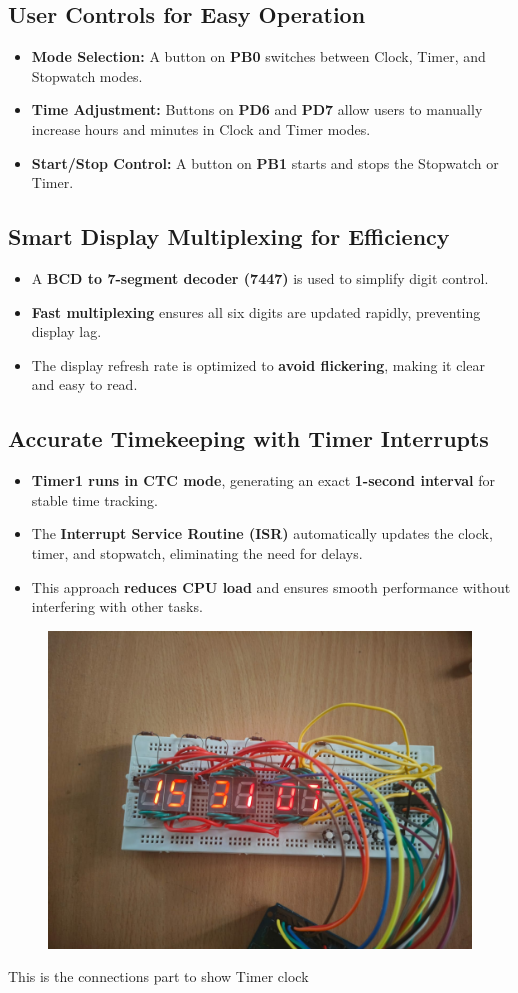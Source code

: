 \documentclass[journal]{IEEEtran}
\begin{document}
\subsection{User Controls for Easy Operation}  
\vspace{0.3cm}  
\begin{itemize}  
    \item \textbf{Mode Selection:} A button on \textbf{PB0} switches between Clock, Timer, and Stopwatch modes.  
    \item \textbf{Time Adjustment:} Buttons on \textbf{PD6} and \textbf{PD7} allow users to manually increase hours and minutes in Clock and Timer modes. 
    \item \textbf{Start/Stop Control:} A button on \textbf{PB1} starts and stops the Stopwatch or Timer.  
\end{itemize}  
\vspace{0.5cm}  

\subsection{Smart Display Multiplexing for Efficiency}  
\vspace{0.3cm}  
\begin{itemize}  
    \item A \textbf{BCD to 7-segment decoder (7447)} is used to simplify digit control.  
    \item \textbf{Fast multiplexing} ensures all six digits are updated rapidly, preventing display lag.  
    \item The display refresh rate is optimized to \textbf{avoid flickering}, making it clear and easy to read.  
\end{itemize}  
\vspace{0.5cm}  

\subsection{Accurate Timekeeping with Timer Interrupts}  
\vspace{0.3cm}  
\begin{itemize}  
    \item \textbf{Timer1 runs in CTC mode}, generating an exact \textbf{1-second interval} for stable time tracking.  
    \item The \textbf{Interrupt Service Routine (ISR)} automatically updates the clock, timer, and stopwatch, eliminating the need for delays.  
    \item This approach \textbf{reduces CPU load} and ensures smooth performance without interfering with other tasks.  
\end{itemize}  

\begin{figure}[h!]
   \centering
   \includegraphics[width=0.50\columnwidth]{figs/timer.jpeg}
   \label{stemplot}
\end{figure}
This is the connections part to show Timer clock
\end{document}
